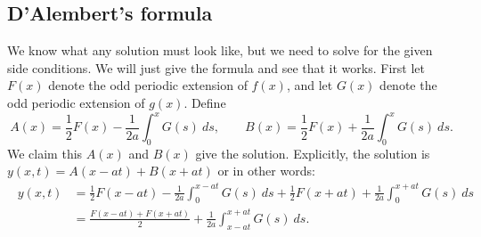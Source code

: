 \subsection{D'Alembert's formula}

We know what any solution must look like, but we need to solve for the
given side conditions.  We will just give the formula and see that it works.
First let $F(x)$
denote the odd periodic extension of $f(x)$, and let $G(x)$ denote the
odd periodic extension of $g(x)$.  Define
\begin{equation*}
A(x) = \frac{1}{2} F(x) - \frac{1}{2a} \int_0^x G(s) ~ds ,
\qquad
B(x) = \frac{1}{2} F(x) + \frac{1}{2a} \int_0^x G(s) ~ds .
\end{equation*}
We claim this $A(x)$ and $B(x)$ give the solution.  Explicitly, the
solution is $y(x,t) = A(x-at) + B(x+at)$ or in other words:
\begin{equation} \label{dalemb:form}
\boxed{~~
\begin{aligned}
y(x,t) & =
\frac{1}{2} F(x-at) - \frac{1}{2a} \int_0^{x-at} G(s) ~ds 
+
\frac{1}{2} F(x+at) + \frac{1}{2a} \int_0^{x+at} G(s) ~ds \\
& =
\frac{F(x-at) + F(x+at)}{2} + \frac{1}{2a} \int_{x-at}^{x+at} G(s) ~ds .
\end{aligned}
~~}
\end{equation}

